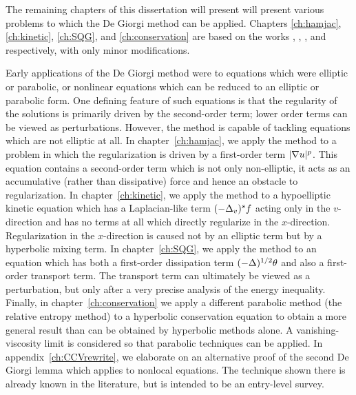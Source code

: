 The remaining chapters of this dissertation will present will present various problems to which the De Giorgi method can be applied.  Chapters \ref{ch:hamjac}, \ref{ch:kinetic}, \ref{ch:SQG}, and \ref{ch:conservation} are based on the works \cite{StVa.hamjac}, \cite{St.hypo}, \cite{StVa.sqg}, and \cite{St.shocks} respectively, with only minor modifications.  

Early applications of the De Giorgi method were to equations which were elliptic or parabolic, or nonlinear equations which can be reduced to an elliptic or parabolic form.  One defining feature of such equations is that the regularity of the solutions is primarily driven by the second-order term; lower order terms can be viewed as perturbations.  However, the method is capable of tackling equations which are not elliptic at all.  In chapter~\ref{ch:hamjac}, we apply the method to a problem in which the regularization is driven by a first-order term $|\nabla u|^p$.  This equation contains a second-order term which is not only non-elliptic, it acts as an accumulative (rather than dissipative) force and hence an obstacle to regularization.  In chapter~\ref{ch:kinetic}, we apply the method to a hypoelliptic kinetic equation which has a Laplacian-like term $(-\Delta_v)^s f$ acting only in the $v$-direction and has no terms at all which directly regularize in the $x$-direction.  Regularization in the $x$-direction is caused not by an elliptic term but by a hyperbolic mixing term.  In chapter~\ref{ch:SQG}, we apply the method to an equation which has both a first-order dissipation term $(-\Delta)^{1/2} \theta$ and also a first-order transport term.  The transport term can ultimately be viewed as a perturbation, but only after a very precise analysis of the energy inequality.  Finally, in chapter~\ref{ch:conservation} we apply a different parabolic method (the relative entropy method) to a hyperbolic conservation equation to obtain a more general result than can be obtained by hyperbolic methods alone.  A vanishing-viscosity limit is considered so that parabolic techniques can be applied. In appendix~\ref{ch:CCVrewrite}, we elaborate on an alternative proof of the second De Giorgi lemma which applies to nonlocal equations.  The technique shown there is already known in the literature, but is intended to be an entry-level survey.  


